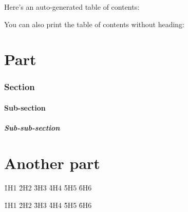 Here's an auto-generated table of contents:

\toc

You can also print the table of contents without heading:

\rawtoc

\part{Part}

\section{Section}

\subsection{Sub-section}

\subsubsection{Sub-sub-section}

\part{Another part}

\h1{H1}
\h2{H2}
\h3{H3}
\h4{H4}
\h5{H5}
\h6{H6}

\appendix

\h1{H1}
\h2{H2}
\h3{H3}
\h4{H4}
\h5{H5}
\h6{H6}

